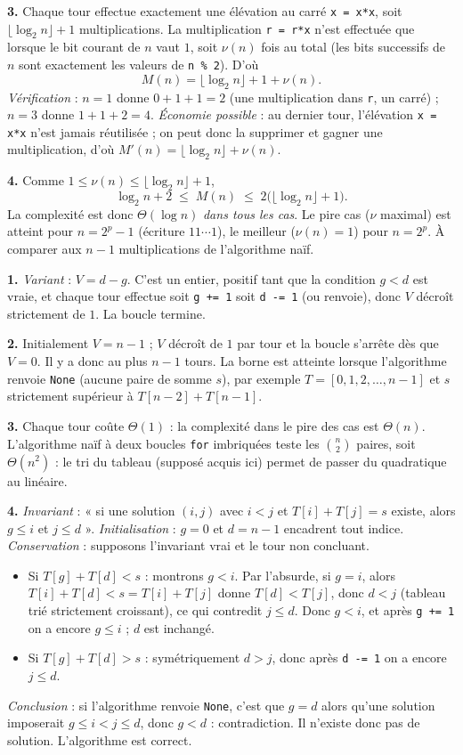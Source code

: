 \documentclass[11pt,a4paper]{article}
\begin{document}
\textbf{3.} Chaque tour effectue exactement une élévation au carré \texttt{x = x*x},
soit $\lfloor\log_2 n\rfloor+1$ multiplications. La multiplication \texttt{r = r*x}
n'est effectuée que lorsque le bit courant de $n$ vaut $1$, soit $\nu(n)$ fois au total
(les bits successifs de $n$ sont exactement les valeurs de \texttt{n \% 2}). D'où
\[
  M(n) = \lfloor\log_2 n\rfloor + 1 + \nu(n).
\]
\emph{Vérification} : $n=1$ donne $0+1+1=2$ (une multiplication dans \texttt{r}, un
carré) ; $n=3$ donne $1+1+2=4$.
\emph{Économie possible} : au dernier tour, l'élévation \texttt{x = x*x} n'est jamais
réutilisée ; on peut donc la supprimer et gagner une multiplication, d'où
$M'(n)=\lfloor\log_2 n\rfloor+\nu(n)$.

\textbf{4.} Comme $1\le\nu(n)\le\lfloor\log_2 n\rfloor+1$,
\[
  \log_2 n + 2 \;\le\; M(n) \;\le\; 2\big(\lfloor\log_2 n\rfloor+1\big).
\]
La complexité est donc $\Theta(\log n)$ \emph{dans tous les cas}.
Le pire cas ($\nu$ maximal) est atteint pour $n=2^{p}-1$ (écriture $11\cdots1$),
le meilleur ($\nu(n)=1$) pour $n=2^{p}$. À comparer aux $n-1$ multiplications de
l'algorithme naïf.

\reponse
\textbf{1.} \emph{Variant} : $V = d-g$. C'est un entier, positif tant que la condition
$g<d$ est vraie, et chaque tour effectue soit \texttt{g += 1} soit \texttt{d -= 1}
(ou renvoie), donc $V$ décroît strictement de $1$. La boucle termine.

\textbf{2.} Initialement $V=n-1$ ; $V$ décroît de $1$ par tour et la boucle s'arrête dès
que $V=0$. Il y a donc au plus $n-1$ tours. La borne est atteinte lorsque
l'algorithme renvoie \texttt{None} (aucune paire de somme $s$), par exemple
$T=[0,1,2,\dots,n-1]$ et $s$ strictement supérieur à $T[n-2]+T[n-1]$.

\textbf{3.} Chaque tour coûte $\Theta(1)$ : la complexité dans le pire des cas est
$\Theta(n)$. L'algorithme naïf à deux boucles \texttt{for} imbriquées teste les
$\binom n2$ paires, soit $\Theta(n^2)$ : le tri du tableau (supposé acquis ici) permet
de passer du quadratique au linéaire.

\textbf{4.} \emph{Invariant} : « si une solution $(i,j)$ avec $i<j$ et $T[i]+T[j]=s$
existe, alors $g\le i$ et $j\le d$ ».
\emph{Initialisation} : $g=0$ et $d=n-1$ encadrent tout indice.
\emph{Conservation} : supposons l'invariant vrai et le tour non concluant.
\begin{itemize}[leftmargin=*,itemsep=1pt]
  \item Si $T[g]+T[d]<s$ : montrons $g<i$. Par l'absurde, si $g=i$, alors
        $T[i]+T[d]<s=T[i]+T[j]$ donne $T[d]<T[j]$, donc $d<j$ (tableau trié
        strictement croissant), ce qui contredit $j\le d$. Donc $g<i$, et après
        \texttt{g += 1} on a encore $g\le i$ ; $d$ est inchangé.
  \item Si $T[g]+T[d]>s$ : symétriquement $d>j$, donc après \texttt{d -= 1} on a
        encore $j\le d$.
\end{itemize}
\emph{Conclusion} : si l'algorithme renvoie \texttt{None}, c'est que $g=d$ alors qu'une
solution imposerait $g\le i<j\le d$, donc $g<d$ : contradiction. Il n'existe donc pas de
solution. L'algorithme est correct.
\end{document}
